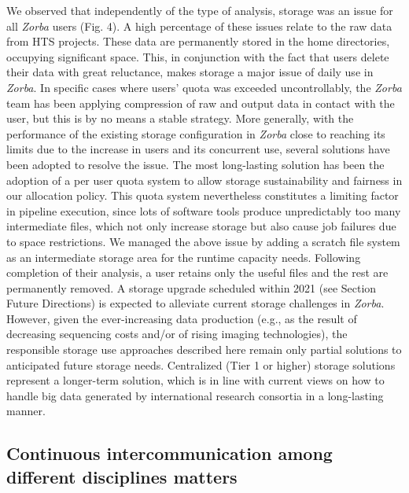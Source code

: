    We observed that independently of the type of analysis, storage was an issue for all \textit{Zorba} users (Fig. 4). 
   A high percentage of these issues relate to the raw data from HTS projects. These data are permanently stored in the home directories, occupying significant space. 
   This, in conjunction with the fact that users delete their data with great reluctance, makes storage a major issue of daily use in \textit{Zorba}. 
   In specific cases where users' quota was exceeded uncontrollably, the \textit{Zorba} team has been applying compression of raw and output data in contact with the user, but this is by no means a stable strategy. 
   More generally, with the performance of the existing storage configuration in \textit{Zorba} close to reaching its limits due to the increase in users and its concurrent use, several solutions have been adopted to resolve the issue. 
   The most long-lasting solution has been the adoption of a per user quota system to allow storage sustainability and fairness in our allocation policy. 
   This quota system nevertheless constitutes a limiting factor in pipeline execution, since lots of software tools produce unpredictably too many intermediate files, which not only increase storage but also cause job failures due to space restrictions. 
   We managed the above issue by adding a scratch file system as an intermediate storage area for the runtime capacity needs. 
   Following completion of their analysis, a user retains only the useful files and the rest are permanently removed. 
   A storage upgrade scheduled within 2021 (see Section Future Directions) is expected to alleviate current storage challenges in \textit{Zorba}. 
   However, given the ever-increasing data production (e.g., as the result of decreasing sequencing costs and/or of rising imaging technologies), the responsible storage use approaches described here remain only partial solutions to anticipated future storage needs. 
   Centralized (Tier 1 or higher) storage solutions represent a longer-term solution, which is in line with current views on how to handle big data generated by international research consortia in a long-lasting manner.



   \subsection*{Continuous intercommunication among different disciplines matters}


